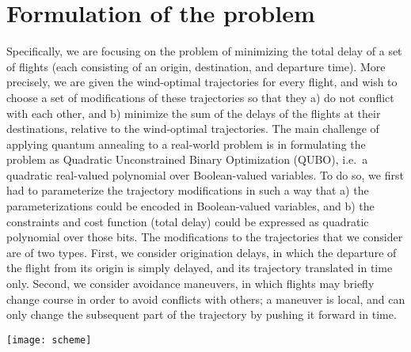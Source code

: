 \section*{Formulation of the problem}\label{sec:approach}

Specifically, we are focusing on the problem of minimizing the total delay of a set of flights (each consisting of an origin, destination, and departure time).
More precisely, we are given the wind-optimal trajectories for every flight, and wish to choose a set of modifications of these trajectories so that they a) do not conflict with each other, and b) minimize the sum of the delays of the flights at their destinations, relative to the wind-optimal trajectories.
The main challenge of applying quantum annealing to a real-world problem is in formulating the problem as Quadratic Unconstrained Binary Optimization (QUBO), i.e.\ a quadratic real-valued polynomial over Boolean-valued variables.
To do so, we first had to parameterize the trajectory modifications in such a way that a) the parameterizations could be encoded in Boolean-valued variables, and b) the constraints and cost function (total delay) could be expressed as quadratic polynomial over those bits.
The modifications to the trajectories that we consider are of two types. 
First, we consider origination delays, in which the departure of the flight from its origin is simply delayed, and its trajectory translated in time only. 
Second, we consider avoidance maneuvers, in which flights may briefly change course in order to avoid conflicts with others;
a maneuver is local, and can only change the subsequent part of the trajectory by pushing it forward in time.

\begin{minipage}[c]{\columnwidth}
\centering
\texttt{[image: scheme]}
\label{fig:scheme}
\end{minipage}

